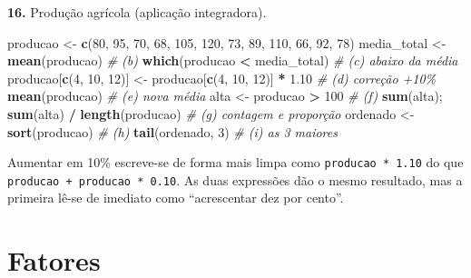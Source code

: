 \documentclass[
  portuguese,
  11pt,
  openany]{book}
\newenvironment{Shaded}{\begin{snugshade}}{\end{snugshade}}
\newcommand{\CommentTok}[1]{\textcolor[rgb]{0.56,0.35,0.01}{\textit{#1}}}
\newcommand{\DecValTok}[1]{\textcolor[rgb]{0.00,0.00,0.81}{#1}}
\newcommand{\FloatTok}[1]{\textcolor[rgb]{0.00,0.00,0.81}{#1}}
\newcommand{\FunctionTok}[1]{\textcolor[rgb]{0.13,0.29,0.53}{\textbf{#1}}}
\newcommand{\NormalTok}[1]{#1}
\newcommand{\OtherTok}[1]{\textcolor[rgb]{0.56,0.35,0.01}{#1}}
\newcommand{\SpecialCharTok}[1]{\textcolor[rgb]{0.81,0.36,0.00}{\textbf{#1}}}
\begin{document}
\textbf{16.} Produção agrícola (aplicação integradora).

\begin{Shaded}
\begin{Highlighting}[]
\NormalTok{producao }\OtherTok{\textless{}{-}} \FunctionTok{c}\NormalTok{(}\DecValTok{80}\NormalTok{, }\DecValTok{95}\NormalTok{, }\DecValTok{70}\NormalTok{, }\DecValTok{68}\NormalTok{, }\DecValTok{105}\NormalTok{, }\DecValTok{120}\NormalTok{, }\DecValTok{73}\NormalTok{, }\DecValTok{89}\NormalTok{, }\DecValTok{110}\NormalTok{, }\DecValTok{66}\NormalTok{, }\DecValTok{92}\NormalTok{, }\DecValTok{78}\NormalTok{)}
\NormalTok{media\_total }\OtherTok{\textless{}{-}} \FunctionTok{mean}\NormalTok{(producao)                          }\CommentTok{\# (b)}
\FunctionTok{which}\NormalTok{(producao }\SpecialCharTok{\textless{}}\NormalTok{ media\_total)                          }\CommentTok{\# (c) abaixo da média}
\NormalTok{producao[}\FunctionTok{c}\NormalTok{(}\DecValTok{4}\NormalTok{, }\DecValTok{10}\NormalTok{, }\DecValTok{12}\NormalTok{)] }\OtherTok{\textless{}{-}}\NormalTok{ producao[}\FunctionTok{c}\NormalTok{(}\DecValTok{4}\NormalTok{, }\DecValTok{10}\NormalTok{, }\DecValTok{12}\NormalTok{)] }\SpecialCharTok{*} \FloatTok{1.10} \CommentTok{\# (d) correção +10\%}
\FunctionTok{mean}\NormalTok{(producao)                                         }\CommentTok{\# (e) nova média}
\NormalTok{alta }\OtherTok{\textless{}{-}}\NormalTok{ producao }\SpecialCharTok{\textgreater{}} \DecValTok{100}                                 \CommentTok{\# (f)}
\FunctionTok{sum}\NormalTok{(alta); }\FunctionTok{sum}\NormalTok{(alta) }\SpecialCharTok{/} \FunctionTok{length}\NormalTok{(producao)                }\CommentTok{\# (g) contagem e proporção}
\NormalTok{ordenado }\OtherTok{\textless{}{-}} \FunctionTok{sort}\NormalTok{(producao)                             }\CommentTok{\# (h)}
\FunctionTok{tail}\NormalTok{(ordenado, }\DecValTok{3}\NormalTok{)                                       }\CommentTok{\# (i) as 3 maiores}
\end{Highlighting}
\end{Shaded}

Aumentar em 10\% escreve-se de forma mais limpa como \texttt{producao\ *\ 1.10} do que
\texttt{producao\ +\ producao\ *\ 0.10}. As duas expressões dão o mesmo resultado, mas a
primeira lê-se de imediato como ``acrescentar dez por cento''.

\section{Fatores}\label{fatores-1}
\end{document}
